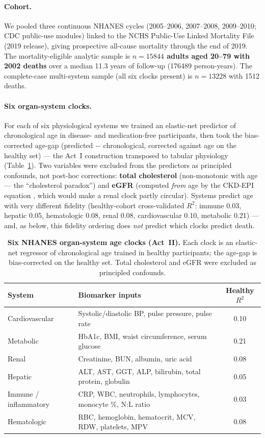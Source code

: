 \documentclass[11pt]{article}
\begin{document}
\paragraph{Cohort.}
We pooled three continuous NHANES cycles (2005--2006, 2007--2008, 2009--2010; CDC public-use
modules) linked to the NCHS Public-Use Linked Mortality File (2019 release), giving prospective
all-cause mortality through the end of 2019. The mortality-eligible analytic sample is
\textbf{$n=\num{15844}$ adults aged 20--79 with \num{2002} deaths} over a median 11.3 years of
follow-up (\num{176489} person-years). The complete-case multi-system sample (all six clocks
present) is $n=\num{13228}$ with \num{1512} deaths.

\paragraph{Six organ-system clocks.}
For each of six physiological systems we trained an elastic-net predictor of chronological age
in disease- and medication-free participants, then took the bias-corrected age-gap (predicted
$-$ chronological, corrected against age on the healthy set) --- the Act~I construction
transposed to tabular physiology (Table~\ref{tab:organs}). Two variables were excluded from the
predictors as principled confounds, not post-hoc corrections: \textbf{total cholesterol}
(non-monotonic with age --- the ``cholesterol paradox'') and \textbf{eGFR} (computed \emph{from}
age by the CKD-EPI equation \citep{levey2009ckdepi}, which would make a renal clock partly
circular). Systems predict age with very different fidelity (healthy-cohort cross-validated
$R^2$: immune 0.03, hepatic 0.05, hematologic 0.08, renal 0.08, cardiovascular 0.10, metabolic
0.21) --- and, as below, this fidelity ordering does \emph{not} predict which clocks predict
death.

\begin{table}[t]
\centering
\caption{\textbf{Six NHANES organ-system age clocks (Act~II).} Each clock is an elastic-net
regressor of chronological age trained in healthy participants; the age-gap is bias-corrected
on the healthy set. Total cholesterol and eGFR were excluded as principled confounds.}
\label{tab:organs}
\begin{tabular}{lp{9.2cm}c}
\toprule
System & Biomarker inputs & Healthy $R^2$ \\
\midrule
Cardiovascular & Systolic/diastolic BP, pulse pressure, pulse rate & 0.10 \\
Metabolic & HbA1c, BMI, waist circumference, serum glucose & 0.21 \\
Renal & Creatinine, BUN, albumin, uric acid & 0.08 \\
Hepatic & ALT, AST, GGT, ALP, bilirubin, total protein, globulin & 0.05 \\
Immune / inflammatory & CRP, WBC, neutrophils, lymphocytes, monocyte \%, N:L ratio & 0.03 \\
Hematologic & RBC, hemoglobin, hematocrit, MCV, RDW, platelets, MPV & 0.08 \\
\bottomrule
\end{tabular}
\end{table}
\end{document}
